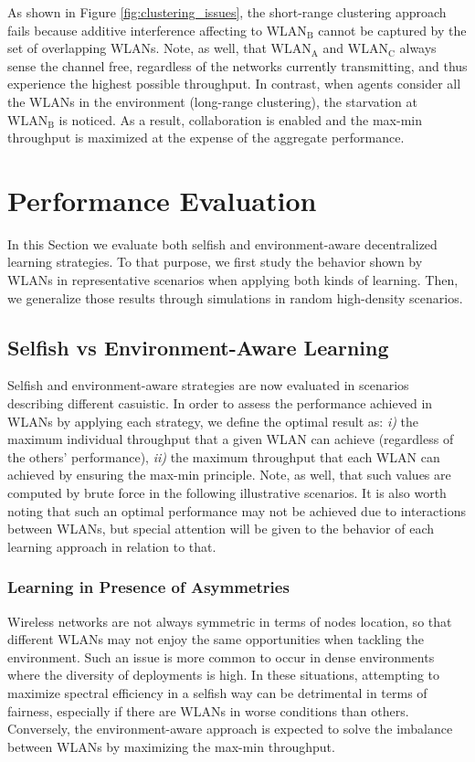 \documentclass[preprint,12pt]{elsarticle}
\begin{document}
As shown in Figure \ref{fig:clustering_issues}, the short-range clustering approach fails because additive interference affecting to $\text{WLAN}_\text{B}$ cannot be captured by the set of overlapping WLANs. Note, as well, that $\text{WLAN}_\text{A}$ and $\text{WLAN}_\text{C}$ always sense the channel free, regardless of the networks currently transmitting, and thus experience the highest possible throughput. In contrast, when agents consider all the WLANs in the environment (long-range clustering), the starvation at $\text{WLAN}_\text{B}$ is noticed. As a result, collaboration is enabled and the max-min throughput is maximized at the expense of the aggregate performance.

\section{Performance Evaluation}			
\label{section:performance_evaluation}				
In this Section we evaluate both selfish and environment-aware decentralized learning strategies. To that purpose, we first study the 
behavior shown by WLANs in representative scenarios when applying both kinds of learning. Then, we generalize those results through simulations in random high-density scenarios.

\subsection{Selfish vs Environment-Aware Learning}
\label{subsection:selfish_vs_informed}  
Selfish and environment-aware strategies are now evaluated in scenarios describing different casuistic. In order to assess the performance achieved in WLANs by applying each strategy, we define the optimal result as: \emph{i)} the maximum individual throughput that a given WLAN can achieve (regardless of the others' performance), \emph{ii)} the maximum throughput that each WLAN can achieved by ensuring the max-min principle. Note, as well, that such values are computed by brute force in the following illustrative scenarios. It is also worth noting that such an optimal performance may not be achieved due to interactions between WLANs, but special attention will be given to the behavior of each learning approach in relation to that.

\subsubsection{Learning in Presence of Asymmetries}
\label{subsubsection:fairness}  	
Wireless networks are not always symmetric in terms of nodes location, so that different WLANs may not enjoy the same opportunities when tackling the environment. Such an issue is more common to occur in dense environments where the diversity of deployments is high. In these situations, attempting to maximize spectral efficiency in a selfish way can be detrimental in terms of fairness, especially if there are WLANs in worse conditions than others. Conversely, the environment-aware approach is expected to solve the imbalance between WLANs by maximizing the max-min throughput.
\end{document}
